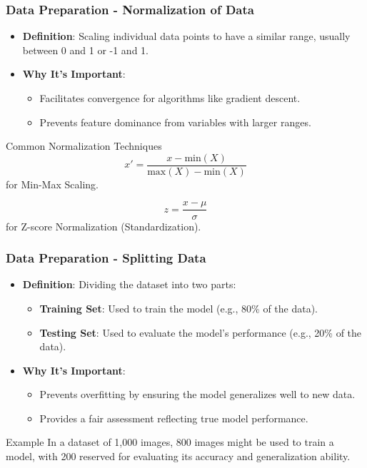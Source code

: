 \documentclass[aspectratio=169]{beamer}
\begin{document}
\begin{frame}[fragile]
    \frametitle{Data Preparation - Normalization of Data}
    \begin{itemize}
        \item \textbf{Definition}: Scaling individual data points to have a similar range, usually between 0 and 1 or -1 and 1.
        \item \textbf{Why It’s Important}:
        \begin{itemize}
            \item Facilitates convergence for algorithms like gradient descent.
            \item Prevents feature dominance from variables with larger ranges.
        \end{itemize}
    \end{itemize}
    
    \begin{block}{Common Normalization Techniques}
        \begin{equation}
            x' = \frac{x - \text{min}(X)}{\text{max}(X) - \text{min}(X)}
        \end{equation}
        for Min-Max Scaling.
        
        \begin{equation}
            z = \frac{x - \mu}{\sigma}
        \end{equation}
        for Z-score Normalization (Standardization).
    \end{block}
\end{frame}

\begin{frame}[fragile]
    \frametitle{Data Preparation - Splitting Data}
    \begin{itemize}
        \item \textbf{Definition}: Dividing the dataset into two parts:
        \begin{itemize}
            \item \textbf{Training Set}: Used to train the model (e.g., 80\% of the data).
            \item \textbf{Testing Set}: Used to evaluate the model's performance (e.g., 20\% of the data).
        \end{itemize}
        \item \textbf{Why It’s Important}:
        \begin{itemize}
            \item Prevents overfitting by ensuring the model generalizes well to new data.
            \item Provides a fair assessment reflecting true model performance.
        \end{itemize}
    \end{itemize}
    
    \begin{block}{Example}
        In a dataset of 1,000 images, 800 images might be used to train a model, with 200 reserved for evaluating its accuracy and generalization ability.
    \end{block}
\end{frame}
\end{document}
